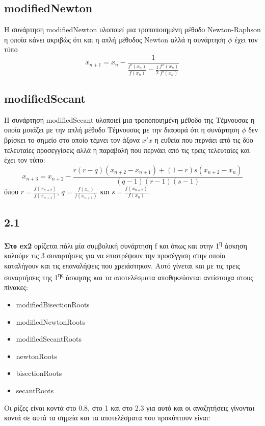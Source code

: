 \documentclass[a4paper,11pt]{article}
\begin{document}
\begin{flushleft}
\subsection*{modifiedNewton}
Η συνάρτηση modifiedNewton υλοποιεί μια τροποποιημένη μέθοδο Newton-Raphson η οποία κάνει ακριβώς ότι και η απλή μέθοδος Newton αλλά η συνάρτηση $\phi$ έχει τον τύπο $$x_{n+1} = x_n-\frac{1}{\frac{f'(x_n)}{f(x_n)}-\frac{1}{2}\frac{f''(x_n)}{f'(x_n)}}$$
\newline

\subsection*{modifiedSecant}
Η συνάρτηση modifiedSecant υλοποιεί μια τροποποιημένη μέθοδο της Τέμνουσας η οποία μοιάζει με την απλή μέθοδο Τέμνουσας με την διαφορά ότι η συνάρτηση $\phi$ δεν βρίσκει το σημείο στο οποίο τέμνει τον άξονα $x'x$ η ευθεία που περνάει από τις δύο τελευταίες προσεγγίσεις αλλά η παραβολή που περνάει από τις τρεις τελευταίες και έχει τον τύπο: 
$$x_{n+3} = x_{n+2} - \frac{r(r-q)(x_{n+2}-x_{n+1})+(1-r)s(x_{n+2}-x_n)}{(q-1)(r-1)(s-1)}$$
όπου $r = \frac{f(x_{n+2})}{f(x_{n+1})}$, $q = \frac{f(x_n)}{f(x_{n+1})}$ και $s = \frac{f(x_{n+2})}{f(x_n)}$.
\newline

\subsection*{2.1}

\textbf{Στο ex2} ορίζεται πάλι μία συμβολική συνάρτηση f και όπως και στην 1\textsuperscript{η} άσκηση καλούμε τις 3 συναρτήσεις για να επιστρέψουν την προσέγγιση στην οποία καταλήγουν και τις επαναλήψεις που χρειάστηκαν. Αυτό γίνεται και με τις τρεις συναρτήσεις της 1\textsuperscript{ης} άσκησης και τα αποτελέσματα αποθηκεύονται αντίστοιχα στους πίνακες: 
\begin{itemize}
    \item modifiedBisectionRoots
    \item modifiedNewtonRoots
    \item modifiedSecantRoots
    \item newtonRoots
    \item bisectionRoots
    \item secantRoots
\end{itemize}

Οι ρίζες είναι κοντά στο 0.8, στο 1 και στο 2.3 για αυτό και οι αναζητήσεις γίνονται κοντά σε αυτά τα σημεία και τα αποτελέσματα που προκύπτουν είναι:


\end{flushleft}
\end{document}
